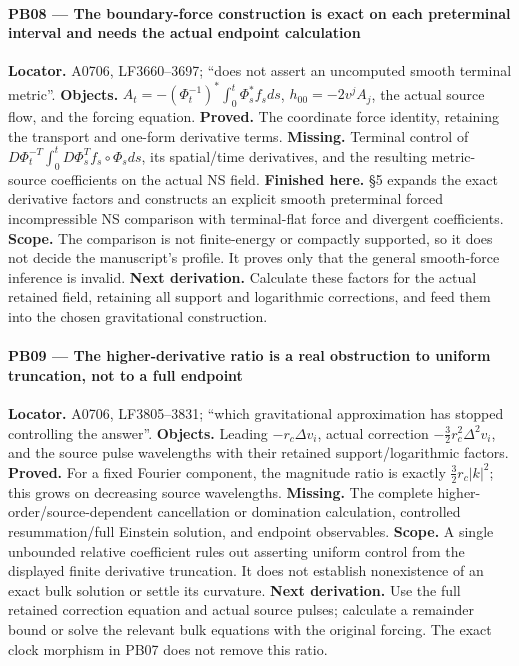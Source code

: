 \paragraph{PB08 --- The boundary-force construction is exact on each
preterminal interval and needs the actual endpoint
calculation}\label{TranscriptLedgerStage:pb08-the-boundary-force-construction-is-exact-on-each-preterminal-interval-and-needs-the-actual-endpoint-calculation}

\textbf{Locator.} A0706, LF3660--3697; ``does not assert an uncomputed
smooth terminal metric''. \textbf{Objects.}
\(A_t=-(\Phi_t^{-1})^*\int_0^t\Phi_s^*f_sds\), \(h_{00}=-2v^jA_j\), the
actual source flow, and the forcing equation. \textbf{Proved.} The
coordinate force identity, retaining the transport and one-form
derivative terms. \textbf{Missing.} Terminal control of
\(D\Phi_t^{-T}\int_0^tD\Phi_s^Tf_s\circ\Phi_sds\), its spatial/time
derivatives, and the resulting metric-source coefficients on the actual
NS field. \textbf{Finished here.} \protect{} §5
expands the exact derivative factors and constructs an explicit smooth
preterminal forced incompressible NS comparison with terminal-flat force
and divergent coefficients. \textbf{Scope.} The comparison is not
finite-energy or compactly supported, so it does not decide the
manuscript's profile. It proves only that the general smooth-force
inference is invalid. \textbf{Next derivation.} Calculate these factors
for the actual retained field, retaining all support and logarithmic
corrections, and feed them into the chosen gravitational construction.

\paragraph{PB09 --- The higher-derivative ratio is a real obstruction to
uniform truncation, not to a full
endpoint}\label{TranscriptLedgerStage:pb09-the-higher-derivative-ratio-is-a-real-obstruction-to-uniform-truncation-not-to-a-full-endpoint}

\textbf{Locator.} A0706, LF3805--3831; ``which gravitational
approximation has stopped controlling the answer''. \textbf{Objects.}
Leading \(-r_c\Delta v_i\), actual correction
\(-\tfrac32r_c^2\Delta^2v_i\), and the source pulse wavelengths with
their retained support/logarithmic factors. \textbf{Proved.} For a fixed
Fourier component, the magnitude ratio is exactly \(\tfrac32r_c|k|^2\);
this grows on decreasing source wavelengths. \textbf{Missing.} The
complete higher-order/source-dependent cancellation or domination
calculation, controlled resummation/full Einstein solution, and endpoint
observables. \textbf{Scope.} A single unbounded relative coefficient
rules out asserting uniform control from the displayed finite derivative
truncation. It does not establish nonexistence of an exact bulk solution
or settle its curvature. \textbf{Next derivation.} Use the full retained
correction equation and actual source pulses; calculate a remainder
bound or solve the relevant bulk equations with the original forcing.
The exact clock morphism in PB07 does not remove this ratio.


